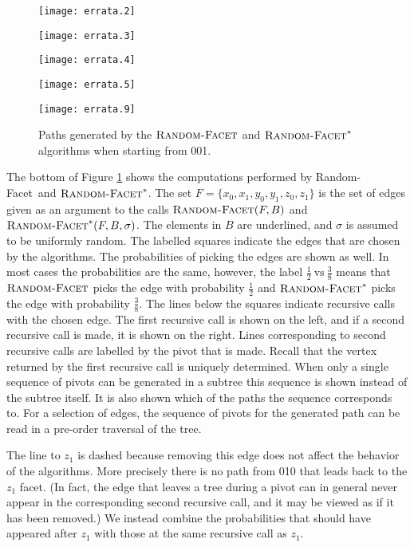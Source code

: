 \documentclass[twoside,11pt]{article}
\newcommand{\RandomFacet}{\mbox{\sc Random-}\allowbreak\mbox{\sc Facet}}
\begin{document}
\begin{figure}[t]
\begin{center}
\parbox{1.2in}{
\center
\texttt{[image: errata.2]}
}
\hspace*{5pt}
\parbox{1.5in}{
\center
\texttt{[image: errata.3]}
}
\hspace*{5pt}
\parbox{1.5in}{
\center
\texttt{[image: errata.4]}
}
\hspace*{5pt}
\parbox{1.5in}{
\center
\texttt{[image: errata.5]}
}

\vspace*{5pt}

\parbox{6in}{
\center
\texttt{[image: errata.9]}
\caption{Paths generated by the $\RandomFacet$ and $\RandomFacet^*$ algorithms when starting from 001.}\label{fig:slower}
}
\end{center}
\end{figure}

The bottom of Figure \ref{fig:slower} shows the computations performed by \RandomFacet\ and $\RandomFacet^*$. The set $F = \{x_0,x_1,y_0,y_1,z_0,z_1\}$ is the set of edges given as an argument to the calls $\RandomFacet(F,B)$ and $\RandomFacet^*(F,B,\sigma)$. The elements in $B$ are underlined, and $\sigma$ is assumed to be uniformly random. The labelled squares indicate the edges that are chosen by the algorithms. The probabilities of picking the edges are shown as well. In most cases the probabilities are the same, however, the label $\frac{1}{2} ~\text{vs}~ \frac{3}{8}$ means that $\RandomFacet$ picks the edge with probability $\frac{1}{2}$ and $\RandomFacet^*$ picks the edge with probability $\frac{3}{8}$. The lines below the squares indicate recursive calls with the chosen edge. The first recursive call is shown on the left, and if a second recursive call is made, it is shown on the right. Lines corresponding to second recursive calls are labelled by the pivot that is made. Recall that the vertex returned by the first recursive call is uniquely determined. When only a single sequence of pivots can be generated in a subtree this sequence is shown instead of the subtree itself. It is also shown which of the paths the sequence corresponds to. For a selection of edges, the sequence of pivots for the generated path can be read in a pre-order traversal of the tree.

The line to $z_1$ is dashed because removing this edge does not affect the behavior of the algorithms. More precisely there is no path from 010 that leads back to the $z_1$ facet. (In fact, the edge that leaves a tree during a pivot can in general never appear in the corresponding second recursive call, and it may be viewed as if it has been removed.) We instead combine the probabilities that should have appeared after $z_1$ with those at the same recursive call as $z_1$.
\end{document}
